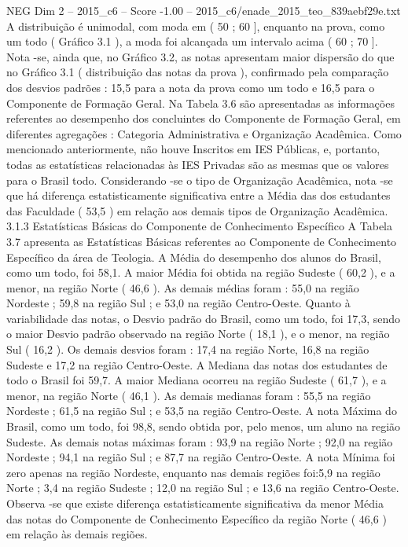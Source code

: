 \begin{textsample}{NEG Dim 2 – 2015\_c6 – Score -1.00 – 2015\_c6/enade\_2015\_teo\_839aebf29e.txt}
A distribuição é unimodal, com moda em ( 50 ; 60 ], enquanto na prova, como um todo ( Gráfico 3.1 ), a moda foi alcançada um intervalo acima ( 60 ; 70 ].
Nota -se, ainda que, no Gráfico 3.2, as notas apresentam maior dispersão do que no Gráfico 3.1 ( distribuição das notas da prova ), confirmado pela comparação dos desvios padrões : 15,5 para a nota da prova como um todo e 16,5 para o Componente de Formação Geral.
Na Tabela 3.6 são apresentadas as informações referentes ao desempenho dos concluintes do Componente de Formação Geral, em diferentes agregações : Categoria Administrativa e Organização Acadêmica.
Como mencionado anteriormente, não houve Inscritos em IES Públicas, e, portanto, todas as estatísticas relacionadas às IES Privadas são as mesmas que os valores para o Brasil todo.
Considerando -se o tipo de Organização Acadêmica, nota -se que há diferença estatisticamente significativa entre a Média das dos estudantes das Faculdade ( 53,5 ) em relação aos demais tipos de Organização Acadêmica. 3.1.3 Estatísticas Básicas do Componente de Conhecimento Específico A Tabela 3.7 apresenta as Estatísticas Básicas referentes ao Componente de Conhecimento Específico da área de Teologia.
A Média do desempenho dos alunos do Brasil, como um todo, foi 58,1.
A maior Média foi obtida na região Sudeste ( 60,2 ), e a menor, na região Norte ( 46,6 ).
As demais médias foram : 55,0 na região Nordeste ; 59,8 na região Sul ; e 53,0 na região Centro-Oeste.
Quanto à variabilidade das notas, o Desvio padrão do Brasil, como um todo, foi 17,3, sendo o maior Desvio padrão observado na região Norte ( 18,1 ), e o menor, na região Sul ( 16,2 ).
Os demais desvios foram : 17,4 na região Norte, 16,8 na região Sudeste e 17,2 na região Centro-Oeste.
A Mediana das notas dos estudantes de todo o Brasil foi 59,7.
A maior Mediana ocorreu na região Sudeste ( 61,7 ), e a menor, na região Norte ( 46,1 ).
As demais medianas foram : 55,5 na região Nordeste ; 61,5 na região Sul ; e 53,5 na região Centro-Oeste.
A nota Máxima do Brasil, como um todo, foi 98,8, sendo obtida por, pelo menos, um aluno na região Sudeste.
As demais notas máximas foram : 93,9 na região Norte ; 92,0 na região Nordeste ; 94,1 na região Sul ; e 87,7 na região Centro-Oeste.
A nota Mínima foi zero apenas na região Nordeste, enquanto nas demais regiões foi:5,9 na região Norte ; 3,4 na região Sudeste ; 12,0 na região Sul ; e 13,6 na região Centro-Oeste.
Observa -se que existe diferença estatisticamente significativa da menor Média das notas do Componente de Conhecimento Específico da região Norte ( 46,6 ) em relação às demais regiões.

\end{textsample}
